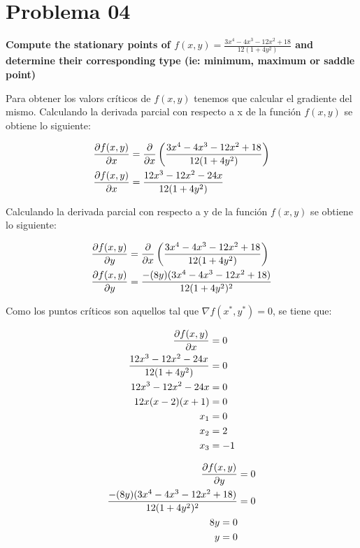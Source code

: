 \section*{Problema 04}

\textbf{Compute the stationary points of $f(x,y)=\frac{3x^4-4x^3-12x^2+18}{12(1+4y^2)}$ and determine their corresponding type (ie: minimum, maximum or saddle point)}

Para obtener los valors críticos de $f(x,y)$ tenemos que calcular el gradiente del mismo. Calculando la derivada parcial con respecto a x de la función $f(x,y)$ se obtiene lo siguiente:

\begin{align*}
    \frac{\partial f(x,y)}{\partial x} & = \frac{\partial }{\partial x} \left (\frac{3x^4-4x^3-12x^2+18}{12(1+4y^2)} \right ) \\
    \frac{\partial f(x,y)}{\partial x} & = \frac{12x^3-12x^2-24x}{12(1+4y^2)}
\end{align*}

Calculando la derivada parcial con respecto a y de la función $f(x,y)$ se obtiene lo siguiente:

\begin{align*}
    \frac{\partial f(x,y)}{\partial y} & = \frac{\partial }{\partial x} \left (\frac{3x^4-4x^3-12x^2+18}{12(1+4y^2)} \right ) \\
    \frac{\partial f(x,y)}{\partial y} & = \frac{-(8y)(3x^4-4x^3-12x^2+18)}{12(1+4y^2)^2}
\end{align*}

Como los puntos críticos son aquellos tal que $\nabla f(x^*,y^*)=0$, se tiene que:

\begin{align*}
    \frac{\partial f(x,y)}{\partial x}               & =0   \\
    \frac{12x^3-12x^2-24x}{12(1+4y^2)} & = 0  \\
    12x^3-12x^2-24x                    & = 0  \\
    12x(x-2)(x+1)                      & = 0  \\
    x_1                                & =0   \\
    x_2                                & = 2  \\
    x_3                                & = -1
\end{align*}

\begin{align*}
    \frac{\partial f(x,y)}{\partial y}                           & = 0 \\
    \frac{-(8y)(3x^4-4x^3-12x^2+18)}{12(1+4y^2)^2} & = 0 \\
    8y = 0                                               \\
    y = 0
\end{align*}

